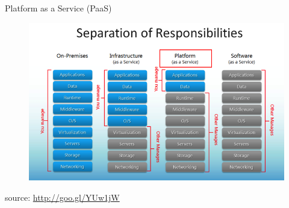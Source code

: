 \begin{frame}{Platform as a Service \footnotesize{(PaaS)}}
{\begin{figure}
			\centering{}
			\includegraphics[scale=0.33]{images/separation-responsabilities.png}
		\end{figure}
		\begin{flushright}
			\tiny{source: \url{http://goo.gl/YUw1jW}}
		\end{flushright}
	}
\end{frame}

